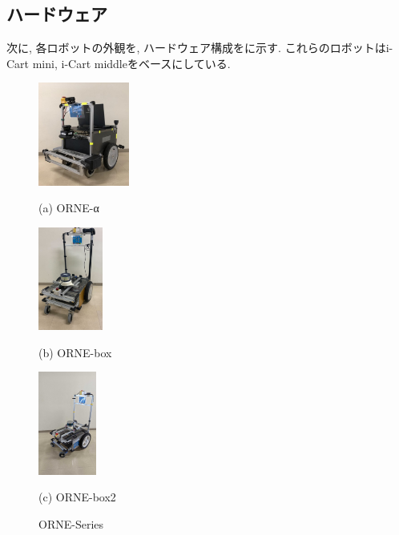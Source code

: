 \documentclass[uplatex, twocolumn, 9pt]{jsproceedings}
\begin{document}
\subsection{ハードウェア}
次に, 各ロボットの外観を, ハードウェア構成をに示す. これらのロボットはi-Cart mini, i-Cart middleをベースにしている.

\begin{figure}[h]
  \centering
  \begin{minipage}[b]{0.3\linewidth}
    \centering
    \includegraphics[width=30mm]{fig/alpha.pdf}
    \caption*{(a) ORNE-α}
  \end{minipage} 
  \hspace{0.03\columnwidth}
  \begin{minipage}[b]{0.3\linewidth}
    \centering
    \includegraphics[height=34mm]{fig/boxkai.pdf}
    \caption*{(b) ORNE-box}
  \end{minipage}
  \begin{minipage}[b]{0.3\linewidth}
    \centering
    \includegraphics[height=34mm]{fig/box2kai.pdf}
    \caption*{(c) ORNE-box2}
  \end{minipage}
  \caption{ORNE-Series}
  \label{fig:orne-series}%
\end{figure}
\end{document}
